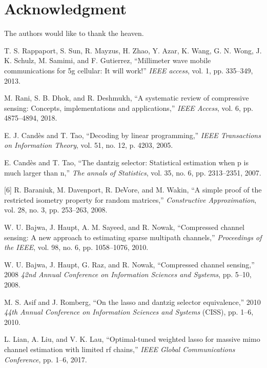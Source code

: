 \documentclass[journal]{IEEEtran}
\begin{document}
{\section*{Acknowledgment}

The authors would like to thank the heaven.


\begin{thebibliography}{30}
T. S. Rappaport, S. Sun, R. Mayzus, H. Zhao, Y. Azar, K. Wang, G. N. Wong, J. K. Schulz, M. Samimi, and F. Gutierrez, “Millimeter wave mobile communications for 5g cellular: It will work!” \textit {IEEE access}, vol. 1, pp. 335–349, 2013.

M. Rani, S. B. Dhok, and R. Deshmukh, “A systematic review of compressive sensing: Concepts, implementations and applications,” \textit {IEEE Access}, vol. 6, pp. 4875–4894, 2018.

E. J. Candès and T. Tao, “Decoding by linear programming,” \textit {IEEE Transactions on Information Theory}, vol. 51, no. 12, p. 4203, 2005.

E. Candès and T. Tao, “The dantzig selector: Statistical estimation when p is much larger than n,” \textit {The annals of Statistics}, vol. 35, no. 6, pp. 2313–2351, 2007.

[6] R. Baraniuk, M. Davenport, R. DeVore, and M. Wakin, “A simple proof of the restricted isometry property for random matrices,” \textit {Constructive Approximation}, vol. 28, no. 3, pp. 253–263, 2008.

W. U. Bajwa, J. Haupt, A. M. Sayeed, and R. Nowak, “Compressed channel sensing: A new approach to estimating sparse multipath channels,” \textit {Proceedings of the IEEE}, vol. 98, no. 6, pp. 1058–1076, 2010.

W. U. Bajwa, J. Haupt, G. Raz, and R. Nowak, “Compressed channel sensing,” 2008 \textit {42nd Annual Conference on Information Sciences and Systems}, pp. 5–10, 2008.

M. S. Asif and J. Romberg, “On the lasso and dantzig selector equivalence,” 2010 \textit {44th Annual Conference on Information Sciences and Systems} (CISS), pp. 1–6, 2010.

L. Lian, A. Liu, and V. K. Lau, “Optimal-tuned weighted lasso for massive mimo channel estimation with limited rf chains,” \textit {IEEE Global Communications Conference}, pp. 1–6, 2017.


\end{thebibliography}}
\end{document}
